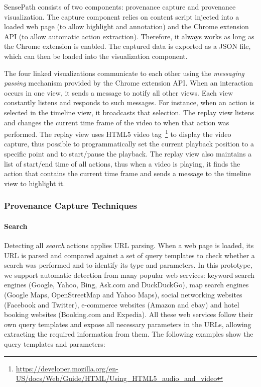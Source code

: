 SensePath consists of two components: provenance capture and provenance visualization. The capture component relies on content script injected into a loaded web page (to allow highlight and annotation) and the Chrome extension API (to allow automatic action extraction). Therefore, it always works as long as the Chrome extension is enabled. The captured data is exported as a JSON file, which can then be loaded into the visualization component.

The four linked visualizations communicate to each other using the \textit{messaging passing} mechanism provided by the Chrome extension API. When an interaction occurs in one view, it sends a message to notify all other views. Each view constantly listens and responds to such messages. For instance, when an action is selected in the timeline view, it broadcasts that selection. The replay view listens and changes the current time frame of the video to when that action was performed. The replay view uses HTML5 video tag~\footnote{\url{https://developer.mozilla.org/en-US/docs/Web/Guide/HTML/Using_HTML5_audio_and_video}} to display the video capture, thus possible to programmatically set the current playback position to a specific point and to start/pause the playback. The replay view also maintains a list of start/end time of all actions, thus when a video is playing, it finds the action that contains the current time frame and sends a message to the timeline view to highlight it.

\subsubsection{Provenance Capture Techniques}

\paragraph{Search}
Detecting all \emph{search} actions applies URL parsing. When a web page is loaded, its URL is parsed and compared against a set of query templates to check whether a search was performed and to identify its type and parameters. In this prototype, we support automatic detection from many popular web services: keyword search engines (Google, Yahoo, Bing, Ask.com and DuckDuckGo), map search engines (Google Maps, OpenStreetMap and Yahoo Maps), social networking websites (Facebook and Twitter), e-commerce websites (Amazon and ebay) and hotel booking websites (Booking.com and Expedia). All these web services follow their own query templates and expose all necessary parameters in the URLs, allowing extracting the required information from them. The following examples show the query templates and parameters:

